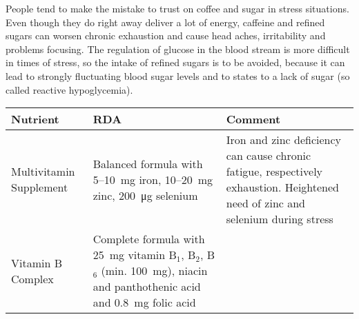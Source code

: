 \documentclass[../main.tex]{subfiles}
\begin{document}
  People tend to make the mistake to trust on coffee and sugar in stress situations.
  Even though they do right away deliver a lot of energy, caffeine and refined sugars
  can worsen chronic exhaustion
  and cause head aches, irritability
  and problems focusing.
  The regulation of glucose in the blood stream is more difficult in times of stress,
  so the intake of refined sugars is to be avoided, because it can lead to strongly fluctuating blood sugar levels
  and to states to a lack of sugar (so called reactive hypoglycemia).

  \begin{table}[htb!]
    \centering
    \begin{tabular}{p{2cm}p{4cm}p{5.5cm}}
      \textbf{Nutrient} &\textbf{RDA} & \textbf{Comment} \\
      \hline
      Multivitamin Supplement & Balanced formula with 5--\SI{10}{\milli\gram} iron\index{mineral!iron}, 10--\SI{20}{\milli\gram} zinc\index{mineral!zinc},
                                \SI{200}{\micro\gram} selenium\index{mineral!selenium}
                                      & Iron and zinc deficiency can cause chronic fatigue, respectively exhaustion. Heightened need of zinc and selenium during stress \\                                                                        Vitamin B Complex & Complete formula with \SI{25}{\milli\gram} vitamin B$_1$\index{vitamin!B1},  B$_2$\index{vitamin!B2},  B$_6$\index{vitamin!B6}
                                                                                                                                                                                                                                                                      (min. \SI{100}{\milli\gram}),
                                                                                                                                                                                                                                                                      niacin\index{micro nutrient!niacin} and panthothenic acid\index{micro nutrient!panthothenic acid}
                                                                                                                                                                                                                                                                      and \SI{0.8}{\milli\gram} folic acid\index{micro nutrient!folic acid}

\end{tabular}
\end{table}
\end{document}
